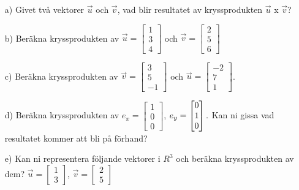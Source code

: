 \begin{itemize}
	\item[a) ] Givet två vektorer $\vec{u}$ och $\vec{v}$, vad blir resultatet av kryssprodukten $\vec{u}$ x $\vec{v}$?
	\item[b) ] Beräkna kryssprodukten av $\vec{u} = \begin{bmatrix} 1 \\ 3 \\ 4\end{bmatrix}$ och $\vec{v} = \begin{bmatrix} 2 \\ 5 \\ 6\end{bmatrix}$
	\item[c) ] Beräkna kryssprodukten av $\vec{v} = \begin{bmatrix} 3 \\ 5 \\ -1 \end{bmatrix}$ och $\vec{u} = \begin{bmatrix} -2 \\ 7 \\ 1 \end{bmatrix}$. 
	\item[d) ] Beräkna kryssprodukten av $e_x = \begin{bmatrix} 1 \\ 0 \\ 0 \end{bmatrix}$, $e_y = \begin{bmatrix} 0 \\ 1 \\ 0 \end{bmatrix}.\\ \\ $ Kan ni gissa vad resultatet kommer att bli på förhand?
	\item[e) ] Kan ni representera följande vektorer i $R^3$ och beräkna kryssprodukten av dem? $\vec{u} = \begin{bmatrix} 1 \\ 3 \end{bmatrix}$, $\vec{v} = \begin{bmatrix} 2 \\ 5 \end{bmatrix}$
\end{itemize}